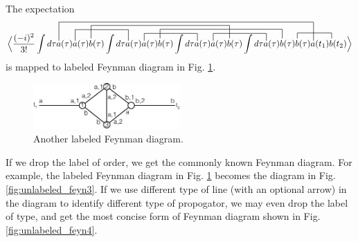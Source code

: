 \documentclass[12pt]{book}
\begin{document}
	The expectation
	\begin{equation}
		\contraction[5ex]{\Big \langle \frac{(-i)^2}{3!}\int d\tau }{a}{(\tau)a(\tau)b(\tau)\int d\tau a(\tau)a(\tau)b(\tau)\int d\tau a(\tau)a(\tau)b(\tau)\int d\tau a(\tau)b(\tau)b(\tau)}{a}
		\contraction[3ex]{\Big \langle \frac{(-i)^2}{3!}\int d\tau a(\tau)}{a}{(\tau)b(\tau)\int d\tau }{a}
		\contraction[3.5ex]{\Big \langle \frac{(-i)^2}{3!}\int d\tau a(\tau)a(\tau)}{b}{(\tau)\int d\tau a(\tau)a(\tau)b(\tau)\int d\tau a(\tau)a(\tau)}{b}
		\contraction[2ex]{\Big \langle \frac{(-i)^2}{3!}\int d\tau a(\tau)a(\tau)b(\tau)\int d\tau a(\tau)}{a}{(\tau)b(\tau)\int d\tau }{a}
		\contraction[2.5ex]{\Big \langle \frac{(-i)^2}{3!}\int d\tau a(\tau)a(\tau)b(\tau)\int d\tau a(\tau)a(\tau)}{b}{(\tau)\int d\tau a(\tau)a(\tau)b(\tau)\int d\tau a(\tau)}{b}
		\contraction[2ex]{\Big \langle \frac{(-i)^2}{3!}\int d\tau a(\tau)a(\tau)b(\tau)\int d\tau a(\tau)a(\tau)b(\tau)\int d\tau a(\tau)}{a}{(\tau)b(\tau)\int d\tau }{a}
		\contraction[1.5ex]{\Big \langle \frac{(-i)^2}{3!}\int d\tau a(\tau)a(\tau)b(\tau)\int d\tau a(\tau)a(\tau)b(\tau)\int d\tau a(\tau)a(\tau)b(\tau)\int d\tau a(\tau)b(\tau)}{b}{(\tau)a(t_1)}{b}
		\Big \langle \frac{(-i)^2}{3!}\int d\tau a(\tau)a(\tau)b(\tau)\int d\tau a(\tau)a(\tau)b(\tau)\int d\tau a(\tau)a(\tau)b(\tau)\int d\tau a(\tau)b(\tau)b(\tau)a(t_1)b(t_2)\Big \rangle
	\end{equation} 
	 is mapped to labeled Feynman diagram in Fig. \ref{fig:labeled_feyn2}.
	
	\begin{figure}[htb]
		\centering  
		\includegraphics[width=0.5\textwidth]{resources/chap_feyn_diag/4_3_feyn_diag2.pdf}
		\caption{Another labeled Feynman diagram.}
		\label{fig:labeled_feyn2} 
	\end{figure}
	
	If we drop the label of order, we get the commonly known Feynman diagram. For example, the labeled Feynman diagram in Fig. \ref{fig:labeled_feyn2} becomes the diagram in Fig. \ref{fig:unlabeled_feyn3}. If we use different type of line (with an optional arrow) in the diagram to identify different type of propogator, we may even drop the label of type, and get the most concise form of Feynman diagram shown in Fig. \ref{fig:unlabeled_feyn4}.
	
\end{document}
